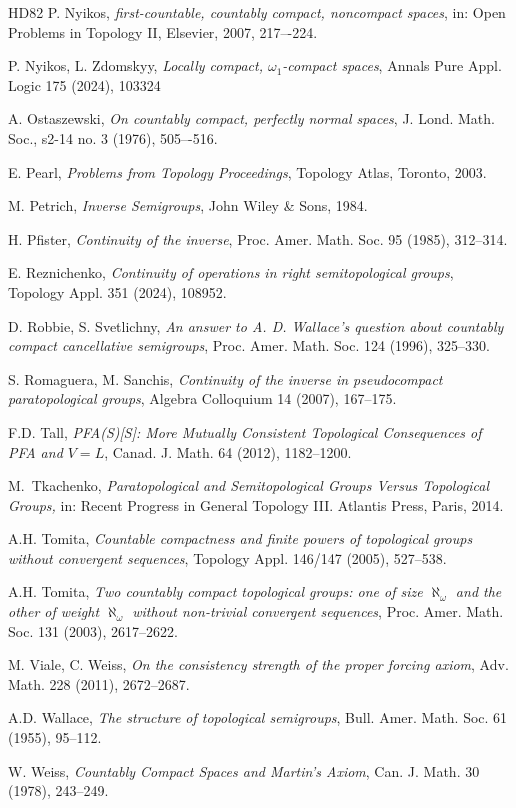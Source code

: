 \documentclass[12pt, twoside, leqno]{article}
\theoremstyle{definition}
\numberwithin{equation}{section}
\begin{document}
\begin{thebibliography}{HD82}
P. Nyikos, {\em first-countable, countably compact, noncompact spaces},
in: Open Problems in Topology II, Elsevier, 2007, 217–-224.

P. Nyikos, L. Zdomskyy, {\em Locally compact, $\omega_1$-compact spaces}, Annals Pure Appl. Logic 175 (2024), 103324

A. Ostaszewski,
{\em On countably compact, perfectly normal spaces},
J. Lond. Math. Soc.,  s2-14 no. 3 (1976), 505–-516.

E. Pearl, {\em Problems from Topology Proceedings}, Topology Atlas, Toronto, 2003.



 M. Petrich, {\em Inverse Semigroups}, John Wiley \& Sons, 1984.


H. Pfister, {\em Continuity of the inverse}, Proc. Amer. Math. Soc. 95 (1985), 312--314.

E. Reznichenko, {\em Continuity of operations in right semitopological groups}, Topology Appl. 351 (2024), 108952.

D. Robbie, S. Svetlichny, {\em An answer to A. D. Wallace’s question about countably compact cancellative semigroups}, Proc. Amer. Math. Soc.  124 (1996), 325--330.


S. Romaguera, M. Sanchis, {\em Continuity of the inverse in pseudocompact paratopological groups}, Algebra Colloquium
14 (2007), 167--175.

F.D. Tall, {\em PFA(S)[S]: More Mutually Consistent
Topological Consequences of
PFA and $V=L$}, Canad. J. Math. 64 (2012), 1182--1200.


M.~Tkachenko, {\em Paratopological and Semitopological Groups Versus Topological Groups,} in: Recent Progress in General Topology III. Atlantis Press, Paris, 2014.

A.H. Tomita, {\em Countable compactness and finite powers of topological groups without convergent sequences}, Topology Appl. 146/147 (2005), 527--538. 

A.H. Tomita, {\em Two countably compact topological groups: one of size $\aleph_\omega$ and the other of weight $\aleph_\omega$ without non-trivial convergent sequences}, Proc. Amer. Math. Soc. 131 (2003), 2617--2622.


M. Viale, C. Weiss, {\em On the consistency strength of the proper forcing axiom}, Adv. Math. 228 (2011), 2672--2687.



A.D. Wallace, {\em The structure of topological semigroups}, Bull. Amer. Math. Soc. 61 (1955), 95--112.

W. Weiss, {\em  Countably Compact Spaces and Martin's Axiom}, Can. J.  Math. 30 (1978), 243--249.



\end{thebibliography}
\end{document}
